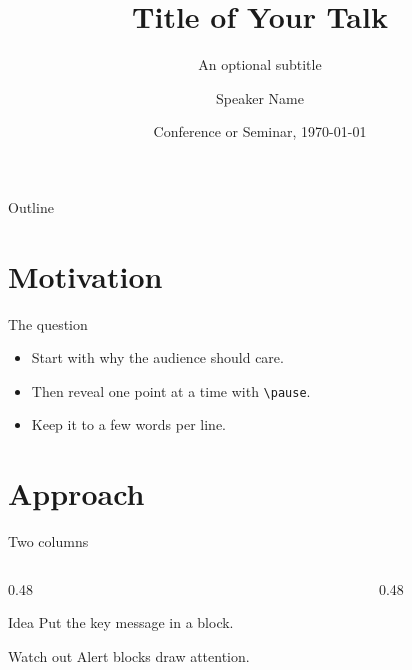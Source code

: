 \documentclass[aspectratio=169,11pt]{beamer} %
\title{Title of Your Talk}
\subtitle{An optional subtitle}
\author{Speaker Name}
\institute{Your Institution}
\date{Conference or Seminar, \today}
\begin{document}
\begin{frame}
  \titlepage
\end{frame}

\begin{frame}{Outline}
  \tableofcontents
\end{frame}

\section{Motivation}

\begin{frame}{The question}
  \begin{itemize}
    \item Start with why the audience should care.
    \pause
    \item Then reveal one point at a time with \texttt{\textbackslash pause}.
    \pause
    \item Keep it to a few words per line.
  \end{itemize}
\end{frame}

\section{Approach}

\begin{frame}{Two columns}
  \begin{columns}[T]
    \begin{column}{0.48\textwidth}
      \begin{block}{Idea}
        Put the key message in a block.
      \end{block}
      \begin{alertblock}{Watch out}
        Alert blocks draw attention.
      \end{alertblock}
    \end{column}
    \begin{column}{0.48\textwidth}
      \centering
    \end{column}
  \end{columns}
\end{frame}
\end{document}

